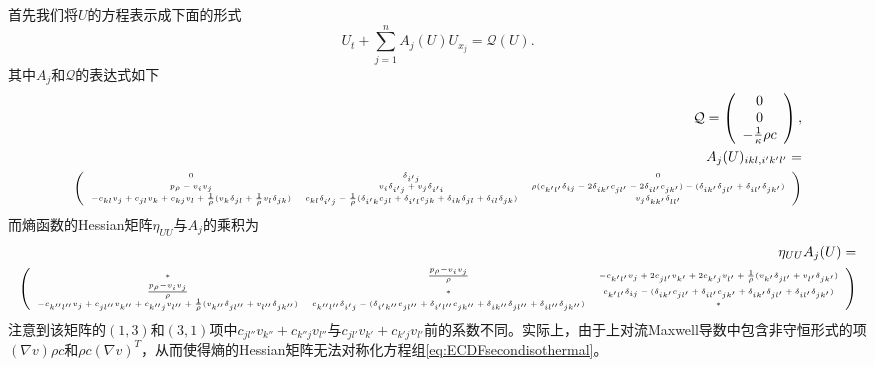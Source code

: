 首先我们将$U$的方程表示成下面的形式
\begin{equation*}
	U_t + \sum_{j=1}^n A_j(U) U_{x_j} = \mathcal{Q}(U).
\end{equation*}
其中$A_j$和$\mathcal{Q}$的表达式如下
\begin{eqnarray*}
	\mathcal{Q} = \left( \begin{array}{c}
		0 \\ 0 \\-\frac{1}{\kappa} \rho c
	\end{array} \right), \\
	 A_j(U)_{ikl,i'k'l'} = \\
	 \tiny \left( \begin{array}{ccc}
		0 & \delta_{i'j} & 0 \\
		p_\rho -v_i v_j & v_i \delta_{i'j}+v_j \delta_{i'i} & \rho (c_{k'l'} \delta_{ij} - 2\delta_{ik'} c_{jl'} - 2\delta_{il'} c_{jk'} ) - (\delta_{ik'} \delta_{jl'} + \delta_{il'} \delta_{jk'}) \\
		- c_{kl} v_j + c_{jl} v_k + c_{kj} v_l + \frac{1}{\rho}({v_k} \delta_{jl} + \frac{1}{\rho} v_l \delta_{jk})  & c_{kl} \delta_{i'j}- \frac{1}{\rho} ( \delta_{i'k} c_{jl} + \delta_{i'l} c_{jk} + \delta_{ik} \delta_{jl} + \delta_{il} \delta_{jk}) & v_j \delta_{kk'} \delta_{ll'}
	\end{array} \right)
\end{eqnarray*}
而熵函数的Hessian矩阵$\eta_{UU}$与$A_j$的乘积为
\begin{eqnarray*}
	\eta_{UU}  A_j(U) = \\
		 \tiny \left( \begin{array}{ccc}
		* & \frac{p_\rho -v_{i} v_j}{\rho}  & - c_{k'l'} v_j + 2 c_{jl'} v_{k'} + 2 c_{k'j} v_{l'} + \frac{1}{\rho}({v_{k'}} \delta_{j{l'}} + v_{l'} \delta_{jk'})  \\
		\frac{p_\rho -v_i v_j}{\rho} & * &  c_{k'l'} \delta_{ij} -( \delta_{ik'} c_{jl'} + \delta_{il'} c_{jk'} +\delta_{ik'} \delta_{jl'} + \delta_{il'} \delta_{jk'}) \\
		- c_{k''l''} v_j + c_{jl''} v_{k''} + c_{k''j} v_{l''} + \frac{1}{\rho}({v_{k''}} \delta_{j{l''}} + v_{l''} \delta_{jk''})  & c_{k''l''} \delta_{i'j} -( \delta_{i'k''} c_{jl''} + \delta_{i'l''} c_{jk''} + \delta_{ik''} \delta_{jl''} + \delta_{il''} \delta_{jk''}) & *
	\end{array} \right)
\end{eqnarray*}
注意到该矩阵的$(1,3)$和$(3,1)$项中$c_{jl''} v_{k''}+ c_{k''j} v_{l''}$与$c_{jl'} v_{k'}+ c_{k'j} v_{l'}$前的系数不同。实际上，由于上对流Maxwell导数中包含非守恒形式的项$(\nabla v) \rho c$和$\rho c (\nabla v)^T$，从而使得熵的Hessian矩阵无法对称化方程组\eqref{eq:ECDFsecondisothermal}。

